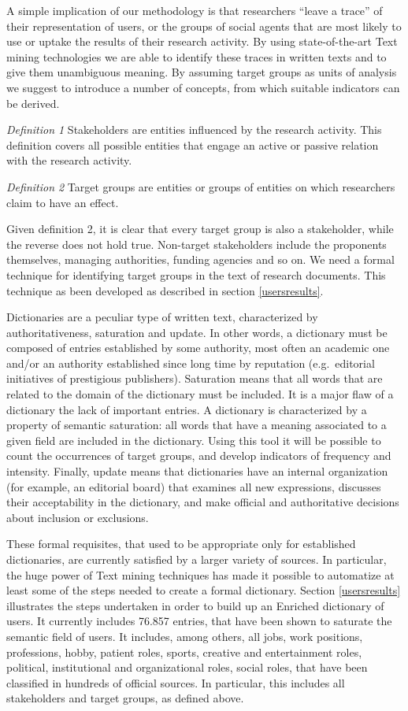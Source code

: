 \documentclass[]{book}
\theoremstyle{definition}
\theoremstyle{definition}
\theoremstyle{definition}
\theoremstyle{remark}
\begin{document}
A simple implication of our methodology is that researchers ``leave a
trace'' of their representation of users, or the groups of social agents
that are most likely to use or uptake the results of their research
activity. By using state-of-the-art Text mining technologies we are able
to identify these traces in written texts and to give them unambiguous
meaning. By assuming target groups as units of analysis we suggest to
introduce a number of concepts, from which suitable indicators can be
derived.

\emph{Definition 1} Stakeholders are entities influenced by the research
activity. This definition covers all possible entities that engage an
active or passive relation with the research activity.

\emph{Definition 2} Target groups are entities or groups of entities on
which researchers claim to have an effect.

Given definition 2, it is clear that every target group is also a
stakeholder, while the reverse does not hold true. Non-target
stakeholders include the proponents themselves, managing authorities,
funding agencies and so on. We need a formal technique for identifying
target groups in the text of research documents. This technique as been
developed as described in section \ref{usersresults}.

Dictionaries are a peculiar type of written text, characterized by
authoritativeness, saturation and update. In other words, a dictionary
must be composed of entries established by some authority, most often an
academic one and/or an authority established since long time by
reputation (e.g.~editorial initiatives of prestigious publishers).
Saturation means that all words that are related to the domain of the
dictionary must be included. It is a major flaw of a dictionary the lack
of important entries. A dictionary is characterized by a property of
semantic saturation: all words that have a meaning associated to a given
field are included in the dictionary. Using this tool it will be
possible to count the occurrences of target groups, and develop
indicators of frequency and intensity. Finally, update means that
dictionaries have an internal organization (for example, an editorial
board) that examines all new expressions, discusses their acceptability
in the dictionary, and make official and authoritative decisions about
inclusion or exclusions.

These formal requisites, that used to be appropriate only for
established dictionaries, are currently satisfied by a larger variety of
sources. In particular, the huge power of Text mining techniques has
made it possible to automatize at least some of the steps needed to
create a formal dictionary. Section \ref{usersresults} illustrates the
steps undertaken in order to build up an Enriched dictionary of users.
It currently includes 76.857 entries, that have been shown to saturate
the semantic field of users. It includes, among others, all jobs, work
positions, professions, hobby, patient roles, sports, creative and
entertainment roles, political, institutional and organizational roles,
social roles, that have been classified in hundreds of official sources.
In particular, this includes all stakeholders and target groups, as
defined above.
\end{document}
